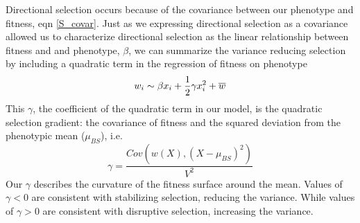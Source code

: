 Directional selection occurs because of the covariance
between our phenotype and fitness, eqn \eqref{S_covar}. Just as we expressing directional selection as a covariance allowed us to
characterize directional selection as the linear relationship between
fitness and and phenotype, $\beta$, we can summarize the variance
reducing selection by including a quadratic term in the regression of
fitness on phenotype
\begin{equation}
w_i \sim \beta x_i + \frac{1}{2}  \gamma x_i^2  + \overline{w} \label{fitness_regression}
\end{equation}
This $\gamma$, the coefficient of the quadratic term in our model, is the
quadratic selection gradient: the covariance of fitness and the squared
deviation from the phenotypic mean ($\mu_{BS}$), i.e.
\begin{equation}
\gamma = \frac{Cov\left(w(X), (X-\mu_{BS})^2 \right)}{V^2}
\end{equation}
Our $\gamma$ describes the curvature of the fitness surface around the
mean. 
Values of $\gamma<0$  are consistent with stabilizing selection,
reducing the variance. While values of $\gamma>0$ are consistent with disruptive
selection, increasing the variance. 



